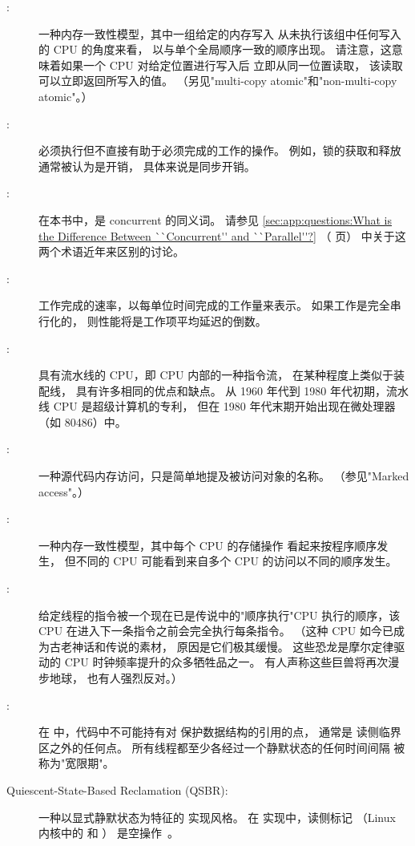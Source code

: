 \begin{description}
\item[:]
	一种内存一致性模型，其中一组给定的内存写入
	从未执行该组中任何写入的 CPU 的角度来看，
	以与单个全局顺序一致的顺序出现。
	请注意，这意味着如果一个 CPU 对给定位置进行写入后
	立即从同一位置读取，
	该读取可以立即返回所写入的值。
	（另见"multi-copy atomic"和"non-multi-copy atomic"。）
\item[:]
	必须执行但不直接有助于必须完成的工作的操作。
	例如，锁的获取和释放通常被认为是开销，
	具体来说是同步开销。
\item[:]
	在本书中，是 concurrent 的同义词。
	请参见
	\cref{sec:app:questions:What is the Difference Between ``Concurrent'' and ``Parallel''?}
	（ 页）
	中关于这两个术语近年来区别的讨论。
\item[:]
	工作完成的速率，以每单位时间完成的工作量来表示。
	如果工作是完全串行化的，
	则性能将是工作项平均延迟的倒数。
\item[:]
	具有流水线的 CPU，即 CPU 内部的一种指令流，
	在某种程度上类似于装配线，
	具有许多相同的优点和缺点。
	从 1960 年代到 1980 年代初期，流水线 CPU 是超级计算机的专利，
	但在 1980 年代末期开始出现在微处理器
	（如 80486）中。
\item[:]
	一种源代码内存访问，只是简单地提及被访问对象的名称。
	（参见"Marked access"。）
\item[:]
	一种内存一致性模型，其中每个 CPU 的存储操作
	看起来按程序顺序发生，
	但不同的 CPU 可能看到来自多个 CPU 的访问以不同的顺序发生。
\item[:]
	给定线程的指令被一个现在已是传说中的"顺序执行"CPU
	执行的顺序，该 CPU 在进入下一条指令之前会完全执行每条指令。
	（这种 CPU 如今已成为古老神话和传说的素材，
	原因是它们极其缓慢。
	这些恐龙是摩尔定律驱动的 CPU 时钟频率提升的众多牺牲品之一。
	有人声称这些巨兽将再次漫步地球，
	也有人强烈反对。）
\item[:]
	在  中，代码中不可能持有对  保护数据结构的引用的点，
	通常是  读侧临界区之外的任何点。
	所有线程都至少各经过一个静默状态的任何时间间隔
	被称为"宽限期"。
\item[Quiescent-State-Based Reclamation (QSBR):]
	一种以显式静默状态为特征的  实现风格。
	在  实现中，读侧标记
	（Linux 内核中的  和 ）
	是空操作~\cite{McKenney98,Slingwine95}。

\end{description}
